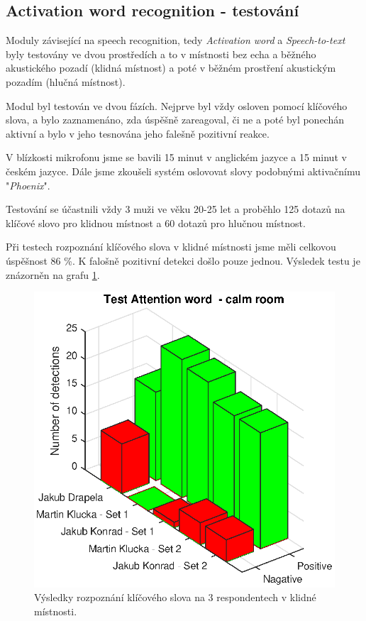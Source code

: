 \documentclass[12pt,a4paper]{article}
\begin{document}
\subsection{Activation word recognition - testování}
Moduly závisející na speech recognition, tedy \textit{Activation word} a \textit{Speech-to-text} byly testovány ve dvou prostředích a to v místnosti bez echa a běžného akustického pozadí (klidná místnost) a poté v běžném prostření akustickým pozadím (hlučná místnost). 

Modul byl testován ve dvou fázích. Nejprve byl vždy osloven pomocí klíčového slova, a bylo zaznamenáno, zda úspěšně zareagoval, či ne a poté byl ponechán aktivní a bylo v jeho tesnována jeho falešně pozitivní reakce. 

V blízkosti mikrofonu jsme se bavili 15 minut v anglickém jazyce a 15 minut v českém jazyce. Dále jsme zkoušeli systém oslovovat slovy podobnými aktivačnímu "\textit{Phoenix}".

 Testování se účastnili vždy 3 muži ve věku 20-25 let a proběhlo 125 dotazů na klíčové slovo pro klidnou místnost a 60 dotazů pro hlučnou místnost.
 
Při testech rozpoznání klíčového slova v klidné místnosti jsme měli celkovou úspěšnost 86 \%. K falošně pozitivní detekci došlo pouze jednou.  Výsledek testu je znázorněn na grafu \ref{fig:AttentionWord}.

	\begin{figure}[ht]
		
		\centering
		\includegraphics[width = 12cm]{AtWr_test.eps}
		\caption{Výsledky rozpoznání klíčového slova na 3 respondentech v klidné místnosti.}
		\label{fig:AttentionWord}
	\end{figure}
	
\end{document}
